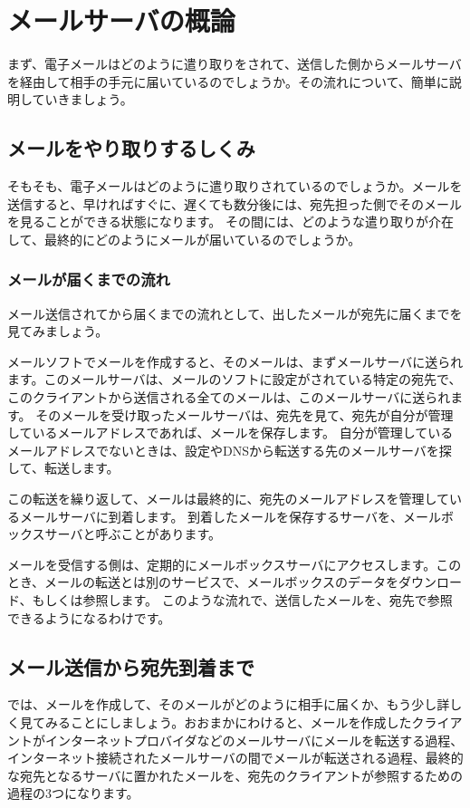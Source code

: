 \chapter{メールサーバの概論}

まず、電子メールはどのように遣り取りをされて、送信した側からメールサーバを経由して相手の手元に届いているのでしょうか。その流れについて、簡単に説明していきましょう。

\section{メールをやり取りするしくみ}

そもそも、電子メールはどのように遣り取りされているのでしょうか。メールを送信すると、早ければすぐに、遅くても数分後には、宛先担った側でそのメールを見ることができる状態になります。
その間には、どのような遣り取りが介在して、最終的にどのようにメールが届いているのでしょうか。

\subsection{メールが届くまでの流れ}

メール送信されてから届くまでの流れとして、出したメールが宛先に届くまでを見てみましょう。

メールソフトでメールを作成すると、そのメールは、まずメールサーバに送られます。このメールサーバは、メールのソフトに設定がされている特定の宛先で、このクライアントから送信される全てのメールは、このメールサーバに送られます。
そのメールを受け取ったメールサーバは、宛先を見て、宛先が自分が管理しているメールアドレスであれば、メールを保存します。
自分が管理しているメールアドレスでないときは、設定やDNSから転送する先のメールサーバを探して、転送します。

この転送を繰り返して、メールは最終的に、宛先のメールアドレスを管理しているメールサーバに到着します。
到着したメールを保存するサーバを、メールボックスサーバと呼ぶことがあります。

メールを受信する側は、定期的にメールボックスサーバにアクセスします。このとき、メールの転送とは別のサービスで、メールボックスのデータをダウンロード、もしくは参照します。
このような流れで、送信したメールを、宛先で参照できるようになるわけです。

\section{メール送信から宛先到着まで}

では、メールを作成して、そのメールがどのように相手に届くか、もう少し詳しく見てみることにしましょう。おおまかにわけると、メールを作成したクライアントがインターネットプロバイダなどのメールサーバにメールを転送する過程、インターネット接続されたメールサーバの間でメールが転送される過程、最終的な宛先となるサーバに置かれたメールを、宛先のクライアントが参照するための過程の3つになります。


